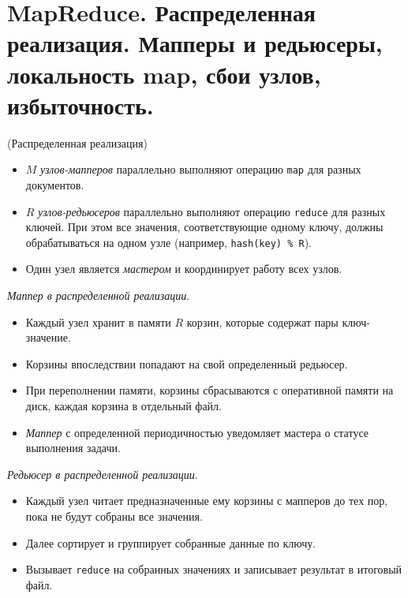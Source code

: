 \section{MapReduce. Распределенная реализация. Мапперы и редьюсеры, локальность
  map, сбои узлов, избыточность.}

\begin{algorithm}(Распределенная реализация)
  \begin{itemize}
    \item $M$ \textit{узлов-мапперов} параллельно выполняют операцию
      \texttt{map} для разных документов.
    \item $R$ \textit{узлов-редьюсеров} параллельно выполняют операцию
      \texttt{reduce} для разных ключей. При этом все значения,
      соответствующие одному ключу, должны обрабатываться на одном узле
      (например, \texttt{hash(key) \% R}).
    \item Один узел является \textit{мастером} и координирует работу всех
      узлов.
  \end{itemize}
\end{algorithm}

\begin{definition}
  \textit{Маппер в распределенной реализации}.
  \begin{itemize}
    \item Каждый узел хранит в памяти $R$ корзин, которые содержат пары ключ-значение.
    \item Корзины впоследствии попадают на свой определенный редьюсер.
    \item При переполнении памяти, корзины сбрасываются с оперативной памяти на
      диск, каждая корзина в отдельный файл.
    \item \textit{Маппер} с определенной периодичностью уведомляет мастера о
      статусе выполнения задачи.
  \end{itemize}
\end{definition}

\begin{definition}
  \textit{Редьюсер в распределенной реализации}.
  \begin{itemize}
    \item Каждый узел читает предназначенные ему корзины с мапперов до тех пор, пока не
      будут собраны все значения.
    \item Далее сортирует и группирует собранные данные по ключу.
    \item Вызывает \texttt{reduce} на собранных значениях и записывает результат
      в итоговый файл.
  \end{itemize}
\end{definition}

